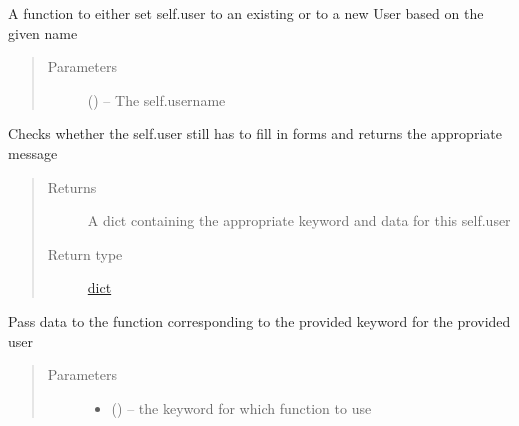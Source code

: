 \documentclass[letterpaper,10pt,english]{sphinxmanual}
\begin{document}
\begin{fulllineitems}

\begin{fulllineitems}
\label{\detokenize{consumer:consumer.Consumer.authenticate}}
A function to either set self.user to an existing {\hyperref[\detokenize{user:user.User}]{}} or to a new User based on the given name
\begin{quote}\begin{description}
\item[{Parameters}] \leavevmode
{} (\href{https://docs.python.org/2/library/functions.html\#str}{}) -- The self.username

\end{description}\end{quote}

\end{fulllineitems}


\begin{fulllineitems}
\label{\detokenize{consumer:consumer.Consumer.check_prerequisites}}
Checks whether the self.user still has to fill in forms and returns the appropriate message
\begin{quote}\begin{description}
\item[{Returns}] \leavevmode
A dict containing the appropriate keyword and data for this self.user

\item[{Return type}] \leavevmode
\href{https://docs.python.org/2/library/stdtypes.html\#dict}{dict}

\end{description}\end{quote}

\end{fulllineitems}


\begin{fulllineitems}
\label{\detokenize{consumer:consumer.Consumer.consumer}}
Pass data to the function corresponding to the provided keyword for the provided user
\begin{quote}\begin{description}
\item[{Parameters}] \leavevmode\begin{itemize}
\item {} 
 (\href{https://docs.python.org/2/library/functions.html\#str}{}) -- the keyword for which function to use


\end{itemize}
\end{description}
\end{quote}
\end{fulllineitems}
\end{fulllineitems}
\end{document}

